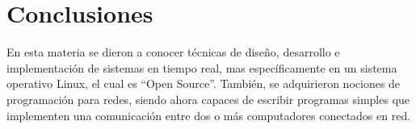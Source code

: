 \section{Conclusiones}
    En esta materia se dieron a conocer técnicas de diseño, desarrollo e implementación de sistemas en tiempo real, mas específicamente en un sistema operativo Linux, el cual es ``Open Source''. También, se adquirieron nociones de programación para redes, siendo ahora capaces de escribir programas simples que implementen una comunicación entre dos o más computadores conectados en red.
\\